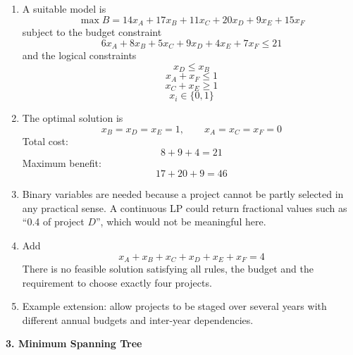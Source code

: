 \documentclass[11pt,a4paper]{article}
\begin{document}
\begin{enumerate}
\item A suitable model is
\[
\max B = 14x_A+17x_B+11x_C+20x_D+9x_E+15x_F
\]
subject to the budget constraint
\[
6x_A+8x_B+5x_C+9x_D+4x_E+7x_F \le 21
\]
and the logical constraints
\[
x_D \le x_B
\]
\[
x_A+x_F \le 1
\]
\[
x_C+x_E \ge 1
\]
\[
x_i \in \{0,1\}
\]

\item The optimal solution is
\[
x_B=x_D=x_E=1,\qquad x_A=x_C=x_F=0
\]
Total cost:
\[
8+9+4=21
\]
Maximum benefit:
\[
17+20+9=46
\]

\item Binary variables are needed because a project cannot be partly selected in any practical sense. A continuous LP could return fractional values such as ``0.4 of project $D$'', which would not be meaningful here.

\item Add
\[
x_A+x_B+x_C+x_D+x_E+x_F = 4
\]
There is no feasible solution satisfying all rules, the budget and the requirement to choose exactly four projects.

\item Example extension: allow projects to be staged over several years with different annual budgets and inter-year dependencies.
\end{enumerate}

\textbf{3. Minimum Spanning Tree}
\end{document}
